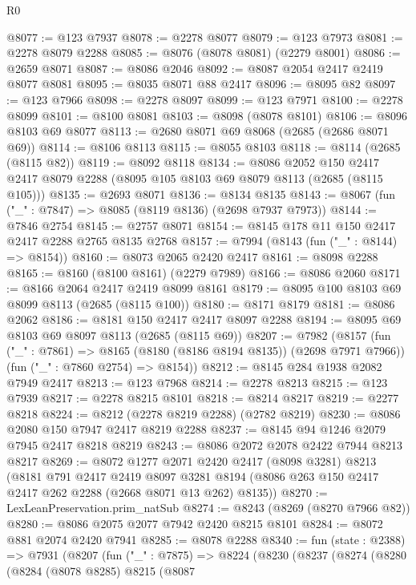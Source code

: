 \begin{lexlean}{R0}
\begin{coremodule}
@8077 := @123 @7937
@8078 := @2278 @8077
@8079 := @123 @7973
@8081 := @2278 @8079 @2288
@8085 := @8076 (@8078 @8081) (@2279 @8001)
@8086 := @2659 @8071
@8087 := @8086 @2046
@8092 := @8087 @2054 @2417 @2419 @8077 @8081
@8095 := @8035 @8071 @88 @2417
@8096 := @8095 @82
@8097 := @123 @7966
@8098 := @2278 @8097
@8099 := @123 @7971
@8100 := @2278 @8099
@8101 := @8100 @8081
@8103 := @8098 (@8078 @8101)
@8106 := @8096 @8103 @69 @8077
@8113 := @2680 @8071 @69 @8068 (@2685 (@2686 @8071 @69))
@8114 := @8106 @8113
@8115 := @8055 @8103
@8118 := @8114 (@2685 (@8115 @82))
@8119 := @8092 @8118
@8134 := @8086
    @2052
    @150
    @2417
    @2417
    @8079
    @2288
    (@8095 @105 @8103 @69 @8079 @8113 (@2685 (@8115 @105)))
@8135 := @2693 @8071
@8136 := @8134 @8135
@8143 := @8067 (fun ("_" : @7847) => @8085 (@8119 @8136) (@2698 @7937 @7973))
@8144 := @7846 @2754
@8145 := @2757 @8071
@8154 := @8145 @178 @11 @150 @2417 @2417 @2288 @2765 @8135 @2768
@8157 := @7994 (@8143 (fun ("_" : @8144) => @8154))
@8160 := @8073 @2065 @2420 @2417
@8161 := @8098 @2288
@8165 := @8160 (@8100 @8161) (@2279 @7989)
@8166 := @8086 @2060
@8171 := @8166 @2064 @2417 @2419 @8099 @8161
@8179 := @8095 @100 @8103 @69 @8099 @8113 (@2685 (@8115 @100))
@8180 := @8171 @8179
@8181 := @8086 @2062
@8186 := @8181 @150 @2417 @2417 @8097 @2288
@8194 := @8095 @69 @8103 @69 @8097 @8113 (@2685 (@8115 @69))
@8207 := @7982
    (@8157
      (fun ("_" : @7861) => @8165 (@8180 (@8186 @8194 @8135)) (@2698 @7971 @7966))
      (fun ("_" : @7860 @2754) => @8154))
@8212 := @8145 @284 @1938 @2082 @7949 @2417
@8213 := @123 @7968
@8214 := @2278 @8213
@8215 := @123 @7939
@8217 := @2278 @8215 @8101
@8218 := @8214 @8217
@8219 := @2277 @8218
@8224 := @8212 (@2278 @8219 @2288) (@2782 @8219)
@8230 := @8086 @2080 @150 @7947 @2417 @8219 @2288
@8237 := @8145 @94 @1246 @2079 @7945 @2417 @8218 @8219
@8243 := @8086 @2072 @2078 @2422 @7944 @8213 @8217
@8269 := @8072
    @1277
    @2071
    @2420
    @2417
    (@8098 @3281)
    @8213
    (@8181
      @791
      @2417
      @2419
      @8097
      @3281
      @8194
      (@8086 @263 @150 @2417 @2417 @262 @2288 (@2668 @8071 @13 @262) @8135))
@8270 := LexLeanPreservation.prim_natSub
@8274 := @8243 (@8269 (@8270 @7966 @82))
@8280 := @8086 @2075 @2077 @7942 @2420 @8215 @8101
@8284 := @8072 @881 @2074 @2420 @7941
@8285 := @8078 @2288
@8340 := fun (state : @2388) =>
  @7931
    (@8207
      (fun ("_" : @7875) =>
      @8224
        (@8230
          (@8237
            (@8274
              (@8280
                (@8284
                  (@8078 @8285)
                  @8215
                  (@8087

\end{coremodule}
\end{lexlean}
